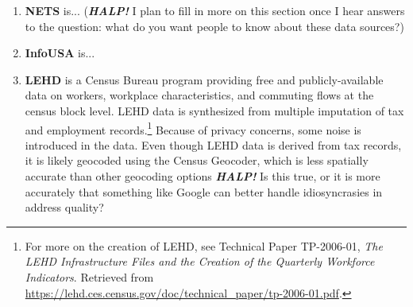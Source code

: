 \documentclass[paper = letter, fontsize = 11pt]{scrartcl}
\begin{document}
\begin{enumerate}
	\item \textbf{NETS} is... (\textbf{\textit{HALP!}} I plan to fill in more on this section once I hear answers to the question: what do you want people to know about these data sources?)
	\item \textbf{InfoUSA} is...
	\item \textbf{LEHD} is a Census Bureau program providing free and publicly-available data on workers, workplace characteristics, and commuting flows at the census block level. LEHD data is synthesized from multiple imputation of tax and employment records.\footnote{For more on the creation of LEHD, see Technical Paper TP-2006-01, \textit{The LEHD Infrastructure Files and the Creation of the Quarterly Workforce Indicators}. Retrieved from \href{https://lehd.ces.census.gov/doc/technical_paper/tp-2006-01.pdf}{https://lehd.ces.census.gov/doc/technical\_paper/tp-2006-01.pdf}.} Because of privacy concerns, some noise is introduced in the data. Even though LEHD data is derived from tax records, it is likely geocoded using the Census Geocoder, which is less spatially accurate than other geocoding options \textbf{\textit{HALP!}} Is this true, or it is more accurately that something like Google can better handle idiosyncrasies in address quality?
\end{enumerate}
\end{document}
